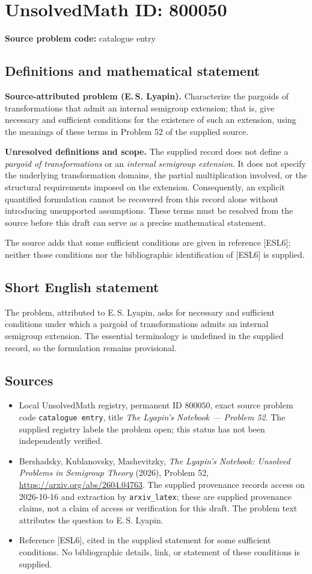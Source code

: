 \documentclass[11pt]{article}
\begin{document}
\section*{UnsolvedMath ID: 800050}
\textbf{Source problem code:} catalogue entry
\subsection{Definitions and mathematical statement}
\textbf{Source-attributed problem (E.\,S. Lyapin).} Characterize the pargoids of transformations that admit an internal semigroup extension; that is, give necessary and sufficient conditions for the existence of such an extension, using the meanings of these terms in Problem 52 of the supplied source.

\textbf{Unresolved definitions and scope.} The supplied record does not define a \emph{pargoid of transformations} or an \emph{internal semigroup extension}. It does not specify the underlying transformation domains, the partial multiplication involved, or the structural requirements imposed on the extension. Consequently, an explicit quantified formulation cannot be recovered from this record alone without introducing unsupported assumptions. These terms must be resolved from the source before this draft can serve as a precise mathematical statement.

The source adds that some sufficient conditions are given in reference [ESL6]; neither those conditions nor the bibliographic identification of [ESL6] is supplied.
\subsection{Short English statement}
The problem, attributed to E.\,S. Lyapin, asks for necessary and sufficient conditions under which a pargoid of transformations admits an internal semigroup extension. The essential terminology is undefined in the supplied record, so the formulation remains provisional.
\subsection{Sources}
\begin{itemize}
\item Local UnsolvedMath registry, permanent ID \(800050\), exact source problem code \texttt{catalogue entry}, title \emph{The Lyapin's Notebook --- Problem 52}. The supplied registry labels the problem open; this status has not been independently verified.
\item Bershadsky, Kublanovsky, Mashevitzky, \emph{The Lyapin's Notebook: Unsolved Problems in Semigroup Theory} (2026), Problem 52, \url{https://arxiv.org/abs/2604.04763}. The supplied provenance records access on 2026-10-16 and extraction by \texttt{arxiv\_latex}; these are supplied provenance claims, not a claim of access or verification for this draft. The problem text attributes the question to E.\,S. Lyapin.
\item Reference [ESL6], cited in the supplied statement for some sufficient conditions. No bibliographic details, link, or statement of these conditions is supplied.
\end{itemize}
\end{document}

